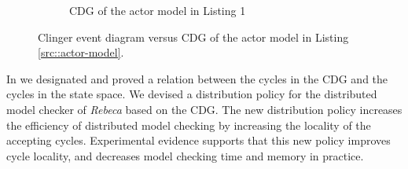 \begin{figure}
\begin{subfigure}[b]{0.2\textwidth}
{  }
  \caption{CDG of the actor model in Listing 1}
\end{subfigure}
\caption{Clinger event diagram versus CDG of the actor model in Listing \ref{src::actor-model}.}
\label{fig::clinger-cdg}
\end{figure}

In \cite{DBLP:journals/eceasst/KhamespanahSMSR15} we designated and proved a relation between the cycles in the CDG and the cycles in the state space. We devised a distribution policy for the distributed model checker of \emph{Rebeca} based on the CDG. The new distribution policy increases the efficiency of distributed model checking by increasing the locality of the accepting cycles.
Experimental evidence supports that this new policy improves cycle locality, and decreases model checking time and memory in practice.